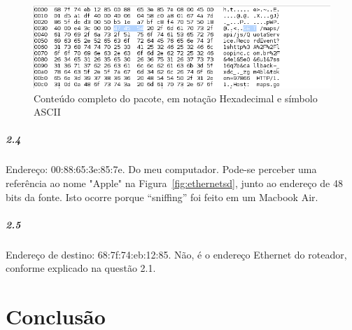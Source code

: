 \documentclass[12pt,a4paper]{report}
\begin{document}
\begin{figure}[h]
\centering
\includegraphics[width=\textwidth]{GET.png}
\caption{Conteúdo completo do pacote, em notação Hexadecimal e símbolo ASCII}
\label{fig:get}
\end{figure}

\paragraph{2.4} Endereço: 00:88:65:3e:85:7e. Do meu computador. Pode-se perceber uma referência ao nome "Apple" na Figura~\ref{fig:ethernetsd}, junto ao endereço de 48 bits da fonte. Isto ocorre porque ``sniffing'' foi feito em um Macbook Air.

\paragraph{2.5} Endereço de destino: 68:7f:74:eb:12:85. Não, é o endereço Ethernet do roteador, conforme explicado na questão 2.1.

\chapter{Conclusão}
\end{document}
